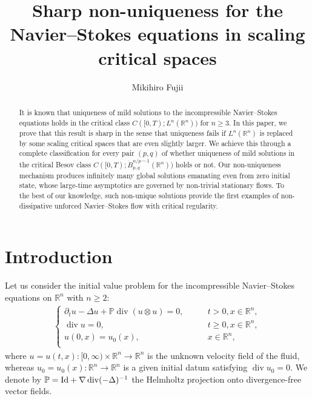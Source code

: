 \documentclass[a4paper,12pt,reqno]{amsart}
\theoremstyle{plain}
\theoremstyle{definition}
\renewcommand{\div}{\operatorname{div}}
\renewcommand{\geq}{\geqslant}
\newcommand{\Id}{{\rm Id}}
\newcommand{\R}{\mathbb{R}}
\begin{document}
\title[Non-uniqueness for the Navier--Stokes equations in critical spaces]
{Sharp non-uniqueness for the Navier--Stokes equations in scaling critical spaces}
\author{Mikihiro Fujii}
\address{Graduate School of Science, Nagoya City University, Nagoya, 467-8501, Japan}
\begin{abstract}
It is known that uniqueness of mild solutions to the incompressible Navier--Stokes equations holds in the critical class $C([0,T);L^n(\mathbb{R}^n))$ for $n \geqslant 3$. 
In this paper, we prove that this result is sharp in the sense that uniqueness fails if $L^n(\mathbb{R}^n)$ is replaced by some scaling critical spaces that are even slightly larger. 
We achieve this through a complete classification for every pair $(p,q)$ of whether uniqueness of mild solutions in the critical Besov class $C([0,T);\dot{B}_{p,q}^{n/p-1}(\mathbb{R}^n))$ holds or not. 
Our non-uniqueness mechanism produces infinitely many global solutions emanating even from zero initial state, whose large-time asymptotics are governed by non-trivial stationary flows.
To the best of our knowledge, such non-unique solutions provide the first examples of non-dissipative unforced Navier--Stokes flow with critical regularity.
\end{abstract}
\maketitle


\section{Introduction}\label{sec:intro}
Let us consider the initial value problem for the incompressible Navier--Stokes equations on $\R^n$ with $n \geq 2$:
\begin{align}\label{eq:NS-intro}
    \begin{cases}
        \partial_t u - \Delta u + \mathbb{P}\div (u \otimes u) = 0, \qquad & t>0, x \in \mathbb{R}^n, \\
        \div u = 0, \qquad & t\geq 0, x \in \mathbb{R}^n, \\
        u(0,x) = u_0(x), & x \in \mathbb{R}^n, \\
    \end{cases}
\end{align}
where $u=u(t,x):[0,\infty) \times \R^n \to \R^n$ is the unknown velocity field of the fluid, whereas $u_0=u_0(x):\R^n \to \R^n$ is a given initial datum satisfying $\div u_0=0$. 
We denote by $\mathbb{P}=\Id+\nabla\div(-\Delta)^{-1}$ the Helmholtz projection onto divergence-free vector fields.
\end{document}
